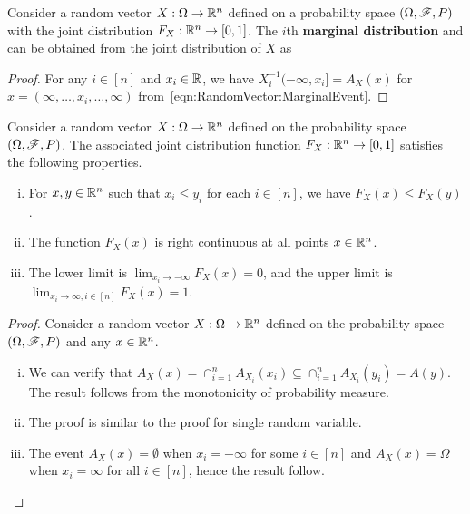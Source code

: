 \documentclass[letterpaper,10pt,english]{article}
\begin{document}
\begin{cor} 
Consider a random vector $X: \Omega \to \mathbb{R}^n$ defined on a probability space $(\Omega, \mathscr{F}, P)$ with the joint distribution $F_X: \mathbb{R}^n \to [0,1]$. 
The $i$th \textbf{marginal distribution} and can be obtained from the joint distribution of $X$ as 
\end{cor}
\begin{proof}
For any $i \in [n]$ and $x_i \in \mathbb{R}$,
we have $X_i^{-1}(-\infty, x_i] = A_X(x)$ for $x = (\infty, \dots, x_i, \dots, \infty)$ 
from~\eqref{eqn:RandomVector:MarginalEvent}.  
\end{proof}

\begin{lem} 
Consider a random vector $X: \Omega \to \mathbb{R}^n$ defined on the probability space $(\Omega,\mathscr{F},P)$. 
The associated joint distribution function $F_X: \mathbb{R}^n \to [0,1]$ satisfies the following properties. 
\begin{enumerate}[(i)]
\item For $x, y \in \mathbb{R}^n$ such that $x_i \le y_i$ for each $i \in [n]$, we have $F_X(x) \le F_X(y)$. 
\item The function $F_X(x)$ is right continuous at all points $x \in \mathbb{R}^n$. 
\item The lower limit is $\lim_{x_i \to -\infty}F_X(x) = 0$, and the upper limit is $\lim_{x_i \to \infty, i \in [n]}F_X(x) = 1$.
\end{enumerate}
\end{lem}
\begin{proof}
Consider a random vector $X: \Omega \to \mathbb{R}^n$ defined on the probability space $(\Omega, \mathscr{F}, P)$ and any $x \in \mathbb{R}^n$. 
\begin{enumerate}[(i)]
\item We can verify that $A_X(x)  = \cap_{i=1}^nA_{X_i}(x_i) \subseteq \cap_{i=1}^nA_{X_i}(y_i) = A(y)$. 
The result follows from the monotonicity of probability measure. 
\item The proof is similar to the proof for single random variable.  
\item The event $A_X(x) = \emptyset$ when $x_i = -\infty$ for some $i \in [n]$ and $A_X(x) = \Omega$ when $x_i = \infty$ for all $i \in [n]$, 
hence the result follow. 
\end{enumerate}
\end{proof}
\end{document}
